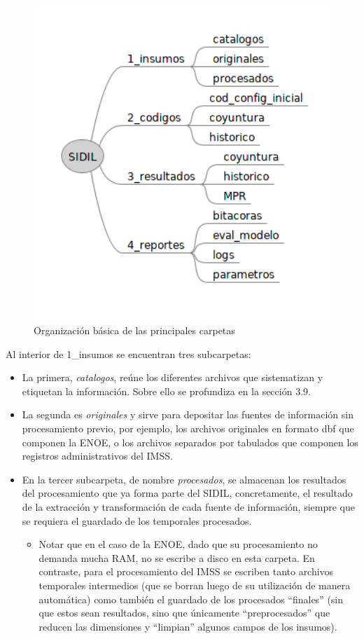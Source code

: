 \documentclass[
]{article}
\providecommand{\tightlist}{%
  \setlength{\itemsep}{0pt}\setlength{\parskip}{0pt}}
\begin{document}
\begin{figure}
\includegraphics[width=4.62in]{images-1/03/organizacion_catalogos} \caption{Organización básica de las principales carpetas}\label{fig:organizacioncatalogos}
\end{figure}

Al interior de 1\_insumos se encuentran tres subcarpetas:

\begin{itemize}
\item
  La primera, \emph{catalogos}, reúne los diferentes archivos que sistematizan y etiquetan la información. Sobre ello se profundiza en la sección 3.9.
\item
  La segunda es \emph{originales} y sirve para depositar las fuentes de información sin procesamiento previo, por ejemplo, los archivos originales en formato dbf que componen la ENOE, o los archivos separados por tabulados que componen los registros administrativos del IMSS.
\item
  En la tercer subcarpeta, de nombre \emph{procesados}, se almacenan los resultados del procesamiento que ya forma parte del SIDIL, concretamente, el resultado de la extracción y transformación de cada fuente de información, siempre que se requiera el guardado de los temporales procesados.

  \begin{itemize}
  \tightlist
  \item
    Notar que en el caso de la ENOE, dado que su procesamiento no demanda mucha RAM, no se escribe a disco en esta carpeta. En contraste, para el procesamiento del IMSS se escriben tanto archivos temporales intermedios (que se borran luego de su utilización de manera automática) como también el guardado de los procesados ``finales'' (sin que estos sean resultados, sino que únicamente ``preprocesados'' que reducen las dimensiones y ``limpian'' algunos campos de los insumos).
  \end{itemize}
\end{itemize}
\end{document}
